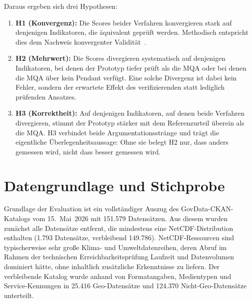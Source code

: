 Daraus ergeben sich drei Hypothesen: 

\begin{enumerate}

    \item \textbf{H1 (Konvergenz):} Die Scores beider Verfahren konvergieren stark auf denjenigen Indikatoren, die äquivalent geprüft werden. Methodisch entspricht dies dem Nachweis konvergenter Validität~\cite{campbell1959convergent}.
    \item \textbf{H2 (Mehrwert):} Die Scores divergieren systematisch auf denjenigen Indikatoren, bei denen der Prototyp tiefer prüft als die MQA oder bei denen die MQA über kein Pendant verfügt. Eine solche Divergenz ist dabei kein Fehler, sondern der erwartete Effekt des verifizierenden statt lediglich prüfenden Ansatzes.
    \item \textbf{H3 (Korrektheit):} Auf denjenigen Indikatoren, auf denen beide Verfahren divergieren, stimmt der Prototyp stärker mit dem Referenzurteil überein als die MQA. H3 verbindet beide Argumentationsstränge und trägt die eigentliche Überlegenheitsaussage: Ohne sie belegt H2 nur, dass anders gemessen wird, nicht dass besser gemessen wird.

\end{enumerate}

\section{Datengrundlage und Stichprobe}
\label{sec:eval_stichprobe}

Grundlage der Evaluation ist ein vollständiger Auszug des GovData-CKAN-Katalogs vom
15.~Mai~2026 mit 151.579 Datensätzen. Aus diesem wurden zunächst alle Datensätze
entfernt, die mindestens eine NetCDF-Distribution enthalten (1.793 Datensätze,
verbleibend 149.786). NetCDF-Ressourcen sind typischerweise sehr große Klima- und
Umweltdatenreihen, deren Abruf im Rahmen der technischen Erreichbarkeitsprüfung
Laufzeit und Datenvolumen dominiert hätte, ohne inhaltlich zusätzliche Erkenntnisse zu
liefern. Der verbleibende Katalog wurde anhand von Formatangaben, Medientypen und
Service-Kennungen in 25.416 Geo-Datensätze und 124.370 Nicht-Geo-Datensätze unterteilt.

